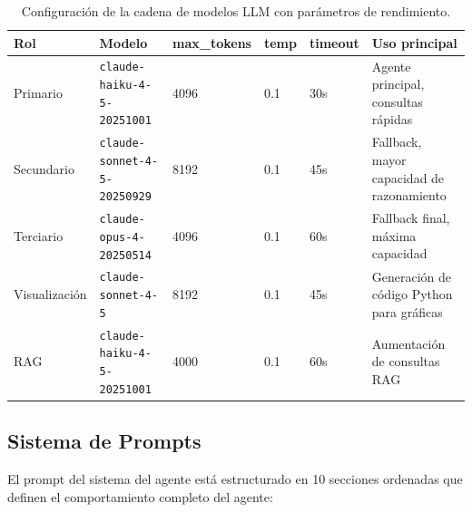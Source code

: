 ﻿\documentclass[11pt,a4paper]{article}
\begin{document}
\begin{table}[H]
\centering
\caption{Configuraci\'on de la cadena de modelos LLM con par\'ametros de rendimiento.}
\label{tab:models}
\begin{tabularx}{\textwidth}{lllllX}
\toprule
\textbf{Rol} & \textbf{Modelo} & \textbf{max\_tokens} & \textbf{temp} & \textbf{timeout} & \textbf{Uso principal} \\
\midrule
Primario & \texttt{claude-haiku-4-5-20251001} & 4096 & 0.1 & 30s & Agente principal, consultas r\'apidas \\
Secundario & \texttt{claude-sonnet-4-5-20250929} & 8192 & 0.1 & 45s & Fallback, mayor capacidad de razonamiento \\
Terciario & \texttt{claude-opus-4-20250514} & 4096 & 0.1 & 60s & Fallback final, m\'axima capacidad \\
Visualizaci\'on & \texttt{claude-sonnet-4-5} & 8192 & 0.1 & 45s & Generaci\'on de c\'odigo Python para gr\'aficas \\
RAG & \texttt{claude-haiku-4-5-20251001} & 4000 & 0.1 & 60s & Aumentaci\'on de consultas RAG \\
\bottomrule
\end{tabularx}
\end{table}

\subsection{Sistema de Prompts}

El prompt del sistema del agente est\'a estructurado en 10 secciones ordenadas que definen el comportamiento completo del agente:
\end{document}
